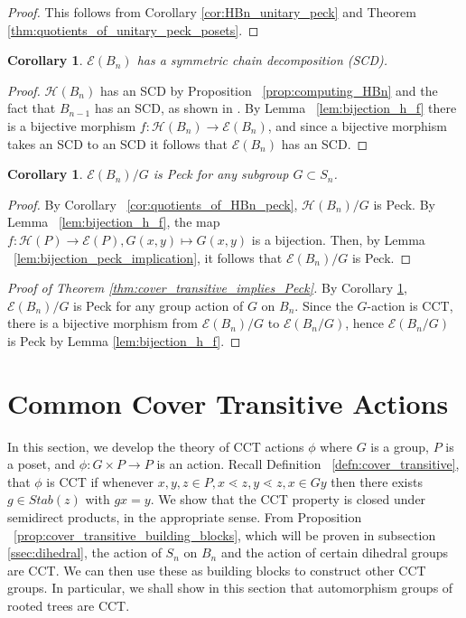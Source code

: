 \documentclass[10 pt]{amsart}
\theoremstyle{plain}
\newtheorem{cor}[thm]{Corollary}
\theoremstyle{definition}
\theoremstyle{remark}
\numberwithin{equation}{section}
\begin{document}
\begin{proof}
This follows from Corollary \ref{cor:HBn_unitary_peck} and Theorem \ref{thm:quotients_of_unitary_peck_posets}.
\end{proof}

\begin{cor}
$\mathcal{E}(B_n)$ has a symmetric chain decomposition (SCD).
\end{cor}


\begin{proof}
$\mathcal{H}(B_n)$ has an SCD by Proposition ~\ref{prop:computing_HBn} and the fact that $B_{n-1}$ has an SCD, as shown in \cite{greene}.  By Lemma ~\ref{lem:bijection_h_f} there is a bijective morphism $f\colon\mathcal{H}(B_n)\rightarrow\mathcal{E}(B_n)$, and since a bijective morphism takes an SCD to an SCD it follows that $\mathcal{E}(B_n)$ has an SCD.
\end{proof}


\begin{cor}
\label{cor:quotiented_edge_peck}
$\mathcal E(B_n)/G$ is Peck for any subgroup $G\subset S_n$.
\end{cor}
\begin{proof}
By Corollary ~\ref{cor:quotients_of_HBn_peck}, $\mathcal H(B_n)/G$ is Peck. By Lemma ~\ref{lem:bijection_h_f}, the map $f:\mathcal H(P) \rightarrow \mathcal E(P),G(x, y) \mapsto G(x, y)$ is a bijection. Then, by Lemma ~\ref{lem:bijection_peck_implication}, it follows that $\mathcal E(B_n)/G$ is Peck.
\end{proof}

\begin{proof}[Proof of Theorem \ref{thm:cover_transitive_implies_Peck}]
By Corollary \ref{cor:quotiented_edge_peck}, $\mathcal{E}(B_n)/G$ is Peck for any group action of $G$ on $B_n.$ Since the $G$-action is CCT, there is a bijective morphism from $\mathcal{E}(B_n)/G$ to $\mathcal{E}(B_n/G)$, hence $\mathcal{E}(B_n/G)$ is Peck by Lemma \ref{lem:bijection_h_f}.
\end{proof}





\section{Common Cover Transitive Actions}
\label{sec:cover_transitive}
In this section, we develop the theory of CCT actions $\phi$ where $G$ is a group, $P$ is a poset, and $\phi:G\times P \rightarrow P$ is an action. Recall Definition ~\ref{defn:cover_transitive}, that $\phi$ is CCT if whenever $x,y,z \in P,x\lessdot z,y\lessdot z,x \in Gy$ then there exists $g \in Stab(z)$ with $gx = y$.  We show that the CCT property is closed under semidirect products, in the appropriate sense. From Proposition ~\ref{prop:cover_transitive_building_blocks}, which will be proven in subsection \ref{ssec:dihedral}, the action of $S_n$ on $B_n$ and the action of certain dihedral groups are CCT. We can then use these as building blocks to construct other CCT groups. In particular, we shall show in this section that automorphism groups of rooted trees are CCT.
\end{document}
